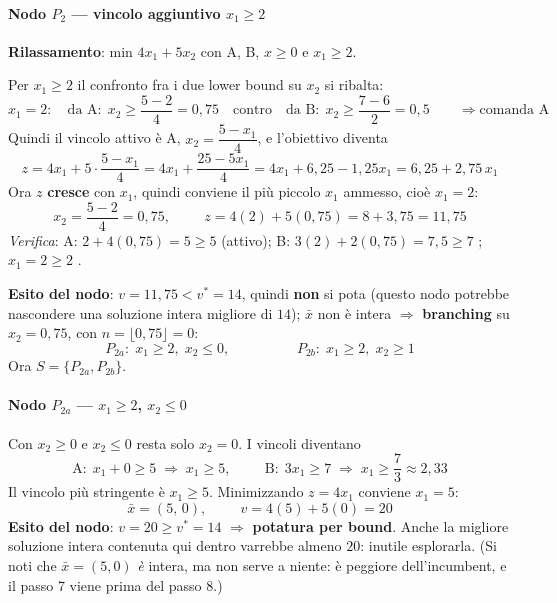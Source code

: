 \documentclass[12pt]{extarticle} %
\begin{document}
\bigskip
\paragraph{Nodo $P_2$ --- vincolo aggiuntivo $x_1 \ge 2$}
\textbf{Rilassamento}: min $4x_1 + 5x_2$ con A, B, $x\ge0$ e $x_1 \ge 2$.

\noindent Per $x_1 \ge 2$ il confronto fra i due lower bound su $x_2$ si ribalta:
\[
x_1 = 2: \quad \text{da A}:\; x_2 \ge \frac{5-2}{4} = 0{,}75 \quad\text{contro}\quad \text{da B}:\; x_2 \ge \frac{7-6}{2} = 0{,}5 \qquad \Rightarrow \text{comanda A}
\]
Quindi il vincolo attivo è A, $x_2 = \dfrac{5 - x_1}{4}$, e l'obiettivo diventa
\[
z = 4x_1 + 5\cdot\frac{5 - x_1}{4} = 4x_1 + \frac{25 - 5x_1}{4} = 4x_1 + 6{,}25 - 1{,}25x_1 = 6{,}25 + 2{,}75\,x_1
\]
Ora $z$ \textbf{cresce} con $x_1$, quindi conviene il più piccolo $x_1$ ammesso, cioè $x_1 = 2$:
\[
x_2 = \frac{5 - 2}{4} = 0{,}75, \hspace{1cm} z = 4(2) + 5(0{,}75) = 8 + 3{,}75 = 11{,}75
\]
\textit{Verifica}: A: $2 + 4(0{,}75) = 5 \ge 5$ \checkmark (attivo); B: $3(2) + 2(0{,}75) = 7{,}5 \ge 7$ \checkmark; $x_1 = 2 \ge 2$ \checkmark.

\textbf{Esito del nodo}: $v = 11{,}75 < v^* = 14$, quindi \textbf{non} si pota (questo nodo potrebbe nascondere una soluzione intera migliore di $14$); $\bar{x}$ non è intera $\Rightarrow$ \textbf{branching} su $x_2 = 0{,}75$, con $n = \lfloor 0{,}75 \rfloor = 0$:
\[
P_{2a}: \; x_1 \ge 2,\; x_2 \le 0, \hspace{2cm} P_{2b}: \; x_1 \ge 2,\; x_2 \ge 1
\]
Ora $S = \{P_{2a}, P_{2b}\}$.

\bigskip
\paragraph{Nodo $P_{2a}$ --- $x_1 \ge 2$, $x_2 \le 0$}
Con $x_2 \ge 0$ e $x_2 \le 0$ resta solo $x_2 = 0$. I vincoli diventano
\[
\text{A}:\; x_1 + 0 \ge 5 \;\Rightarrow\; x_1 \ge 5, \hspace{1cm}
\text{B}:\; 3x_1 \ge 7 \;\Rightarrow\; x_1 \ge \frac{7}{3} \approx 2{,}33
\]
Il vincolo più stringente è $x_1 \ge 5$. Minimizzando $z = 4x_1$ conviene $x_1 = 5$:
\[
\bar{x} = (5,\,0), \hspace{1cm} v = 4(5) + 5(0) = 20
\]
\textbf{Esito del nodo}: $v = 20 \ge v^* = 14$ $\Rightarrow$ \textbf{potatura per bound}. Anche la migliore soluzione intera contenuta qui dentro varrebbe almeno $20$: inutile esplorarla. (Si noti che $\bar{x} = (5,0)$ \emph{è} intera, ma non serve a niente: è peggiore dell'incumbent, e il passo 7 viene prima del passo 8.)
\end{document}
